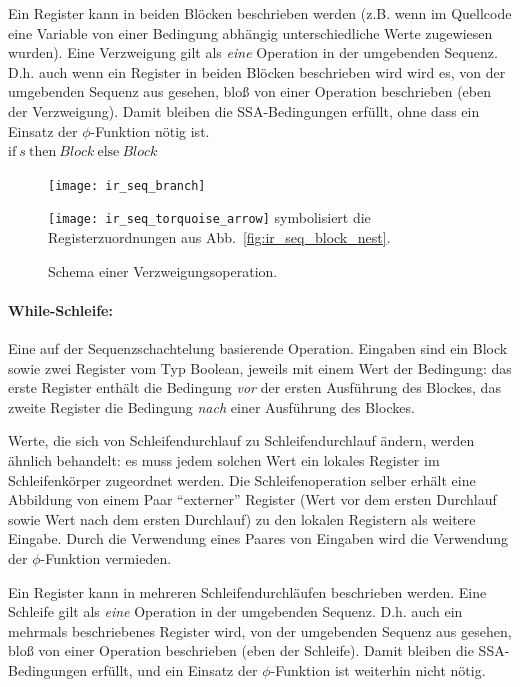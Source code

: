 \documentclass[twoside,a4paper,fleqn,12pt]{article}
\begin{document}
Ein Register kann in beiden Blöcken beschrieben werden (z.B. wenn im Quellcode eine Variable von einer Bedingung abhängig unterschiedliche Werte zugewiesen wurden).
Eine Verzweigung gilt als \emph{eine} Operation in der umgebenden Sequenz. D.h. auch wenn ein Register in beiden Blöcken beschrieben wird wird es,
von der umgebenden Sequenz aus gesehen, bloß von einer Operation beschrieben (eben der Verzweigung). Damit bleiben die SSA-Bedingungen erfüllt,
ohne dass ein Einsatz der $\phi$-Funktion nötig ist.
\\\hspace*{1cm}$\mathrm{if}\ s\ \mathrm{then}\ \mathit{Block}\ \mathrm{else}\ \mathit{Block}$


\begin{figure}[h]
   \centering
  \texttt{[image: ir\_seq\_branch]}
  \caption{Schema einer Verzweigungsoperation.}
  \small\texttt{[image: ir\_seq\_torquoise\_arrow]} symbolisiert die Registerzuordnungen aus Abb.~\ref{fig:ir_seq_block_nest}.
  \label{fig:ir_seq_branch}
\end{figure}

\paragraph{While-Schleife:} Eine auf der Sequenzschachtelung basierende Operation. Eingaben sind ein Block sowie zwei Register vom
Typ Boolean, jeweils mit einem Wert der Bedingung: das erste Register enthält die Bedingung \emph{vor} der ersten Ausführung des Blockes,
das zweite Register die Bedingung \emph{nach} einer Ausführung des Blockes.

Werte, die sich von Schleifendurchlauf zu Schleifendurchlauf ändern, werden ähnlich behandelt: es muss jedem solchen Wert ein lokales
Register im Schleifenkörper zugeordnet werden. Die Schleifenoperation selber erhält eine Abbildung von einem Paar "`externer"' Register
(Wert vor dem ersten Durchlauf sowie Wert nach dem ersten Durchlauf) zu den lokalen Registern als weitere Eingabe. Durch die Verwendung eines
Paares von Eingaben wird die Verwendung der $\phi$-Funktion vermieden.

Ein Register kann in mehreren Schleifendurchläufen beschrieben werden.
Eine Schleife gilt als \emph{eine} Operation in der umgebenden Sequenz. D.h. auch ein mehrmals beschriebenes Register wird,
von der umgebenden Sequenz aus gesehen, bloß von einer Operation beschrieben (eben der Schleife).
Damit bleiben die SSA-Bedingungen erfüllt, und ein Einsatz der $\phi$-Funktion ist weiterhin nicht nötig.
\end{document}
